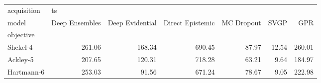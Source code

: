 \begin{tabular}{lrrrrrr}
\toprule
acquisition & \multicolumn{6}{l}{ts} \\
model & Deep Ensembles & Deep Evidential & Direct Epistemic & MC Dropout &   SVGP &     GPR \\
objective  &                &                 &                  &            &        &         \\
\midrule
Shekel-4   &         261.06 &          168.34 &           690.45 &      87.97 &  12.54 &  260.01 \\
Ackley-5   &         207.65 &          120.31 &           718.28 &      63.21 &   9.64 &  184.97 \\
Hartmann-6 &         253.03 &           91.56 &           671.24 &      78.67 &   9.05 &  222.98 \\
\bottomrule
\end{tabular}
